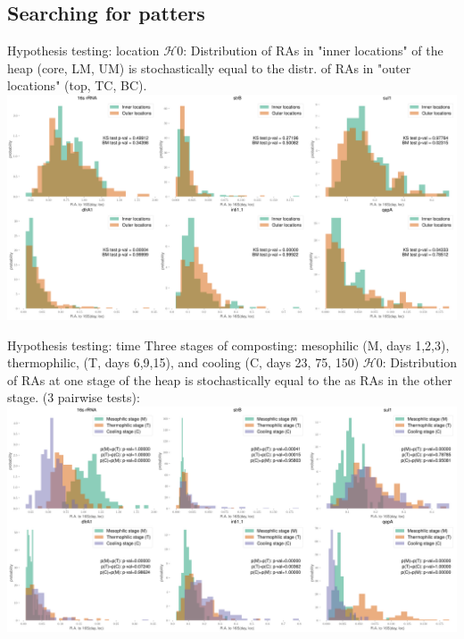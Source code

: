 \documentclass[mathserif,11pt]{beamer}
\begin{document}
\subsection{Searching for patters}
\begin{frame}{Hypothesis testing: location}
$\mathcal{H}0$: Distribution of RAs in "inner locations" of the heap (core, LM, UM) is stochastically equal to the distr. of RAs in "outer locations" (top, TC, BC).
	\includegraphics[width=\textwidth]{Figures/Sian_inner_vs_outer_hists_first_6_assays.png}
\end{frame}
\begin{frame}{Hypothesis testing: time}
Three stages of composting: mesophilic (M, days 1,2,3), thermophilic, (T, days 6,9,15), and cooling (C, days 23, 75, 150)
$\mathcal{H}0$: Distribution of RAs at one stage of the heap is stochastically equal to the  as RAs in the other stage. (3 pairwise tests):
	\includegraphics[width=\textwidth]{Figures/Sian_heating_hists_first_6_assays.png}
\end{frame}
\end{document}
